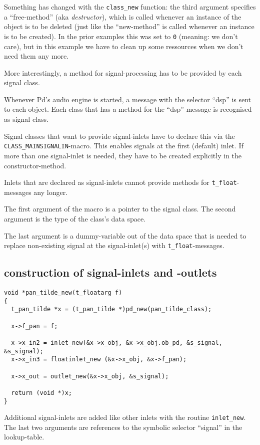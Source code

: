 \documentclass[12pt, a4paper,english,titlepage]{article}
\begin{document}
Something has changed with the \verb+class_new+ function: 
the third argument specifies a ``free-method'' (aka {\em destructor}), which is called whenever an instance of the object
is to be deleted (just like the ``new-method'' is called whenever an instance is to be created).
In the prior examples this was set to \verb+0+ (meaning: we don't care),
but in this example we have to clean up some ressources when we don't need them any more.

More interestingly, a method for signal-processing has to be provided by each signal class.

Whenever Pd's audio engine is started, a message with the selector ``dsp''
is sent to each object.
Each class that has a method for the ``dsp''-message is recognised as signal class.

Signal classes that want to provide signal-inlets have to
declare this via the \verb+CLASS_MAINSIGNALIN+-macro.
This enables signals at the first (default) inlet.
If more than one signal-inlet is needed, they have to be created explicitly
in the constructor-method.

Inlets that are declared as signal-inlets cannot provide
methods for \verb+t_float+-messages any longer.

The first argument of the macro is a pointer to the signal class.
The second argument is the type of the class's data space.

The last argument is a dummy-variable out of the data space that is needed
to replace non-existing signal at the signal-inlet(s) with \verb+t_float+-messages.

\subsection{construction of signal-inlets and -outlets}

\begin{verbatim}
void *pan_tilde_new(t_floatarg f)
{
  t_pan_tilde *x = (t_pan_tilde *)pd_new(pan_tilde_class);

  x->f_pan = f;

  x->x_in2 = inlet_new(&x->x_obj, &x->x_obj.ob_pd, &s_signal, &s_signal);
  x->x_in3 = floatinlet_new (&x->x_obj, &x->f_pan);

  x->x_out = outlet_new(&x->x_obj, &s_signal);

  return (void *)x;
}
\end{verbatim}

Additional signal-inlets are added like other inlets with the routine \verb+inlet_new+.
The last two arguments are references to the symbolic selector ``signal''
in the lookup-table.
\end{document}
